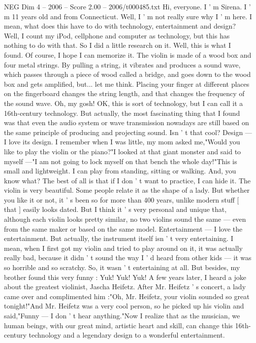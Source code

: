 \begin{textsample}{NEG Dim 4 – 2006 – Score 2.00 – 2006/t000485.txt}  \label{ex:f4_neg_076}
Hi, everyone.
I ' m Sirena.
I ' m 11 years old and from Connecticut.
Well, I ' m not really sure why I ' m here.
I mean, what does this have to do with technology, entertainment and design?
Well, I count my iPod, cellphone and computer as technology, but this has nothing to do with that.
So I did a little research on it.
Well, this is what I found.
Of course, I hope I can memorize it.
The violin is made of a wood box and four metal strings.
By pulling a string, it vibrates and produces a sound wave, which passes through a piece of wood called a bridge, and goes down to the wood box and gets amplified, but... let me think.
Placing your finger at different places on the fingerboard changes the string length, and that changes the frequency of the sound wave.
Oh, my gosh!
OK, this is sort of technology, but I can call it a 16th-century technology.
But actually, the most fascinating thing that I found was that even the audio system or wave transmission nowadays are still based on the same principle of producing and projecting sound.
Isn ' t that cool?
Design — I love its design.
I remember when I was little, my mom asked me,"Would you like to play the violin or the piano?"I looked at that giant monster and said to myself —"I am not going to lock myself on that bench the whole day!"This is small and lightweight.
I can play from standing, sitting or walking.
And, you know what?
The best of all is that if I don ' t want to practice, I can hide it.
The violin is very beautiful.
Some people relate it as the shape of a lady.
But whether you like it or not, it ' s been so for more than 400 years, unlike modern stuff [ that ] easily looks dated.
But I think it ' s very personal and unique that, although each violin looks pretty similar, no two violins sound the same — even from the same maker or based on the same model.
Entertainment — I love the entertainment.
But actually, the instrument itself isn ' t very entertaining.
I mean, when I first got my violin and tried to play around on it, it was actually really bad, because it didn ' t sound the way I ' d heard from other kids — it was so horrible and so scratchy.
So, it wasn ' t entertaining at all.
But besides, my brother found this very funny : Yuk!
Yuk!
Yuk!
A few years later, I heard a joke about the greatest violinist, Jascha Heifetz.
After Mr.
Heifetz ' s concert, a lady came over and complimented him :"Oh, Mr.
Heifetz, your violin sounded so great tonight!"And Mr.
Heifetz was a very cool person, so he picked up his violin and said,"Funny — I don ' t hear anything."Now I realize that as the musician, we human beings, with our great mind, artistic heart and skill, can change this 16th-century technology and a legendary design to a wonderful entertainment.

\end{textsample}
